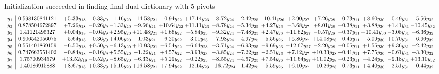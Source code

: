 \documentclass[9pt]{article}
\begin{document}
Initialization succeeded in finding final dual dictionary with 5 pivots
\[\begin{array}{c| c c@{\hskip 2pt} c@{\hskip 2pt} c@{\hskip 2pt} c@{\hskip 2pt} c@{\hskip 2pt} c@{\hskip 2pt} c@{\hskip 2pt} c@{\hskip 2pt} c@{\hskip 2pt} c@{\hskip 2pt} c@{\hskip 2pt} c@{\hskip 2pt} c@{\hskip 2pt} c@{\hskip 2pt} c@{\hskip 2pt} }
 y_{1}   &  0.598130841121 & +  5.33 y_{18} & -0.33 y_{9} & -1.16 y_{20} & -14.58 y_{21} & -0.94 y_{22} & + 17.14 y_{23} & +  8.72 y_{24} & -2.42 y_{25} & -10.41 y_{26} & +  2.90 y_{27} & +  7.26 y_{28} & +  0.73 y_{11} & +  8.60 y_{30} & -0.49 y_{31} & -5.56 y_{32}\\
 y_{2}   &  0.878504672897 & +  7.26 y_{18} & -0.26 y_{9} & -1.33 y_{20} & -9.66 y_{21} & + 10.64 y_{22} & + 11.11 y_{23} & +  8.78 y_{24} & -5.34 y_{25} & +  4.27 y_{26} & -3.68 y_{27} & +  8.01 y_{28} & +  0.38 y_{11} & +  3.88 y_{30} & +  1.41 y_{31} & -10.45 y_{32}\\
 y_{3}   &  1.41121495327 & +  0.04 y_{18} & -0.04 y_{9} & +  2.95 y_{20} & + 11.48 y_{21} & +  1.66 y_{22} & -5.84 y_{23} & -9.32 y_{24} & -7.48 y_{25} & +  2.47 y_{26} & + 11.62 y_{27} & -0.57 y_{28} & -0.37 y_{11} & + 10.41 y_{30} & -3.08 y_{31} & +  6.36 y_{32}\\
 y_{4}   &  0.906542056075 & -5.64 y_{18} & -0.36 y_{9} & +  4.06 y_{20} & +  1.03 y_{21} & -6.20 y_{22} & +  3.01 y_{23} & +  7.98 y_{24} & +  4.97 y_{25} & -5.56 y_{26} & +  5.86 y_{27} & + 14.08 y_{28} & +  0.45 y_{11} & -5.09 y_{30} & +  0.70 y_{31} & +  6.96 y_{32}\\
 y_{5}   &  0.551401869159 & -6.50 y_{18} & +  0.50 y_{9} & -6.13 y_{20} & + 10.93 y_{21} & -6.54 y_{22} & +  6.64 y_{23} & +  3.71 y_{24} & -6.93 y_{25} & -9.69 y_{26} & -12.67 y_{27} & -2.20 y_{28} & -0.05 y_{11} & +  1.55 y_{30} & +  9.36 y_{31} & +  2.42 y_{32}\\
 y_{6}   &  0.747663551402 & -0.84 y_{18} & -0.16 y_{9} & +  5.55 y_{20} & -1.22 y_{21} & +  4.57 y_{22} & +  3.93 y_{23} & -3.85 y_{24} & +  7.22 y_{25} & -2.51 y_{26} & +  7.12 y_{27} & + 10.33 y_{28} & +  0.41 y_{11} & +  7.75 y_{30} & -0.61 y_{31} & +  3.30 y_{32}\\
 y_{7}   &  1.75700934579 & + 13.52 y_{18} & -0.52 y_{9} & -8.65 y_{20} & -6.33 y_{21} & +  5.29 y_{22} & +  0.22 y_{23} & +  8.55 y_{24} & -4.67 y_{25} & +  7.54 y_{26} & + 11.64 y_{27} & + 11.02 y_{28} & -0.23 y_{11} & -4.24 y_{30} & -9.18 y_{31} & + 13.10 y_{32}\\
 y_{8}   &  1.40186915888 & +  8.67 y_{18} & +  0.33 y_{9} & +  5.16 y_{20} & + 16.58 y_{21} & +  7.94 y_{22} & -12.14 y_{23} & -16.72 y_{24} & +  1.42 y_{25} & -5.59 y_{26} & +  6.10 y_{27} & -10.26 y_{28} & -0.73 y_{11} & +  4.40 y_{30} & -2.51 y_{31} & -0.44 y_{32}\\

\end{array}\]
\end{document}

